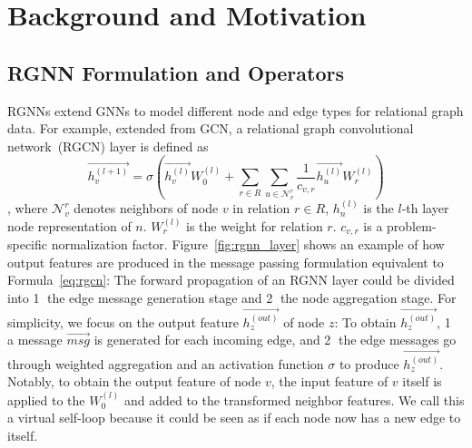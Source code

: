 \section{Background and Motivation}\label{sec:background}

\subsection{RGNN Formulation and Operators}
\label{sec:rgnn_formulation}



RGNNs extend GNNs to model different node and edge types for relational graph data.
For example, extended from GCN, a relational graph convolutional network~(RGCN) layer is defined as 
\begin{equation} \label{eq:rgcn}
     \overrightarrow{{h}_v^{(l+1)}} = \sigma\left(\overrightarrow{{h}_v^{(l)}}W_0^{(l)}+\sum_{r \in R}\sum_{u \in \mathcal{N}_v^r}\frac{1}{c_{v,r}}\overrightarrow{{h}_u^{(l)}}W_r^{(l)}\right)
\end{equation}
, where $\mathcal{N}_v^r$ denotes neighbors of node $v$ in relation $r \in R$, 
${h}_n^{(l)}$ is the $l$-th layer node representation of $n$. 
$W_r^{(l)}$ is the weight for relation $r$. $c_{v,r}$ is a problem-specific normalization factor.
Figure~\ref{fig:rgnn_layer} shows an example of how output features are produced in the message passing formulation equivalent to Formula~\ref{eq:rgcn}: 
The forward propagation of an RGNN layer could be divided into \textcircled{1} the edge message generation stage and \textcircled{2} the node aggregation stage.
For simplicity, we focus on the output feature $\overrightarrow{h_z^{(out)}}$ of node $z$: To obtain $\overrightarrow{h_z^{(out)}}$, \textcircled{1} a message $\overrightarrow{msg}$ is generated for each incoming edge, and \textcircled{2} the edge messages go through weighted aggregation and an activation function $\sigma$ to produce $\overrightarrow{h_z^{(out)}}$. 
Notably, to obtain the output feature of node $v$, the input feature of $v$ itself is applied to the $W_0^{(l)}$ and added to the transformed neighbor features. We call this a virtual self-loop because it could be seen as if each node now has a new edge to itself.




